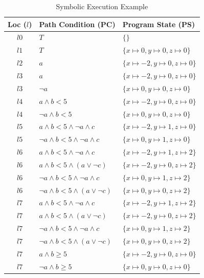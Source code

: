 \documentclass[oneside,11pt,dvipsnames]{book}
\begin{document}
\begin{table}
    \centering
    \caption{Symbolic Execution Example}\label{tab:symbolic-execution}
    \begin{tabular}{c|l|l}
\toprule
\textbf{Loc ($l$)} & \textbf{Path Condition} (PC) & \textbf{Program State} (PS) \\
\midrule
$l0$ & $T$ & $\{\}$ \\
$l1$ & $T$ & $\{x\mapsto0, y\mapsto0, z\mapsto0\}$ \\
$l2$ & $a$ & $\{x\mapsto-2, y\mapsto0, z\mapsto0\}$ \\
\midrule
$l3$ & $a$ & $\{x\mapsto-2, y\mapsto0, z\mapsto0\}$ \\
$l3$ & $\lnot a$ & $\{x\mapsto0, y\mapsto0, z\mapsto0\}$ \\
\midrule
$l4$ & $a \land b < 5$ & $\{x\mapsto-2, y\mapsto0, z\mapsto0\}$ \\
$l4$ & $\lnot a \land b < 5$ & $\{x\mapsto0, y\mapsto0, z\mapsto0\}$ \\
\midrule
$l5$ & $a \land b < 5 \land \lnot a \land c$ & $\{x\mapsto-2, y\mapsto1, z\mapsto0\}$ \\
$l5$ & $\lnot a \land b < 5 \land \lnot a \land c$ & $\{x\mapsto0, y\mapsto1, z\mapsto0\}$ \\
\midrule
$l6$ & $a \land b < 5 \land \lnot a \land c$ & $\{x\mapsto-2, y\mapsto1, z\mapsto2\}$ \\
$l6$ & $a \land b < 5 \land (a \lor \lnot c)$ & $\{x\mapsto-2, y\mapsto0, z\mapsto2\}$ \\
$l6$ & $\lnot a \land b < 5 \land \lnot a \land c$ & $\{x\mapsto0, y\mapsto1, z\mapsto2\}$ \\
$l6$ & $\lnot a \land b < 5 \land (a \lor \lnot c)$ & $\{x\mapsto0, y\mapsto0, z\mapsto2\}$ \\
\midrule
$l7$ & $a \land b < 5 \land \lnot a \land c$ & $\{x\mapsto-2, y\mapsto1, z\mapsto2\}$ \\
$l7$ & $a \land b < 5 \land (a \lor \lnot c)$ & $\{x\mapsto-2, y\mapsto0, z\mapsto2\}$ \\
$l7$ & $\lnot a \land b < 5 \land \lnot a \land c$ & $\{x\mapsto0, y\mapsto1, z\mapsto2\}$ \\
$l7$ & $\lnot a \land b < 5 \land (a \lor \lnot c)$ & $\{x\mapsto0, y\mapsto0, z\mapsto2\}$ \\

$l7$ & $a \land b \ge 5$ & $\{x\mapsto-2, y\mapsto0, z\mapsto0\}$ \\
$l7$ & $\lnot a \land b \ge 5 $ & $\{x\mapsto0, y\mapsto0, z\mapsto0\}$ \\
\bottomrule
\end{tabular}
\end{table}
\end{document}
